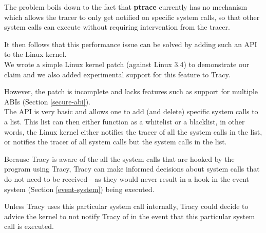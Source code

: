 \documentclass[a4paper, 10pt]{report}
\begin{document}
The problem boils down to the fact that \textbf{ptrace} currently
has no mechanism which allows the tracer to only get notified on specific
system calls, so that other system calls can execute without requiring
intervention from the tracer.

It then follows that this performance
issue can be solved by adding such an API to the Linux kernel. \\

We wrote a simple Linux kernel patch (against Linux 3.4) to demonstrate
our claim and we also added experimental support for this feature to Tracy.

However, the patch is incomplete and lacks features such as support for
multiple ABIs (Section \ref{secure-abi}). \\

The API is very basic and allows one to add (and delete) specific system
calls to a list. This list can then either function as a whitelist or a
blacklist, in other words, the Linux kernel either notifies the tracer of
all the system calls in the list, or notifies the tracer of all system calls
but the system calls in the list.


Because Tracy is aware of the all the system calls that are hooked by the
program using Tracy, Tracy can make informed decisions about system calls
that do not need to be received - as they would never result in a hook in
the event system (Section \ref{event-system}) being executed.

Unless Tracy uses this particular system call internally, Tracy could decide
to advice the kernel to not notify Tracy of in the event that this particular
system call is executed.



\end{document}
